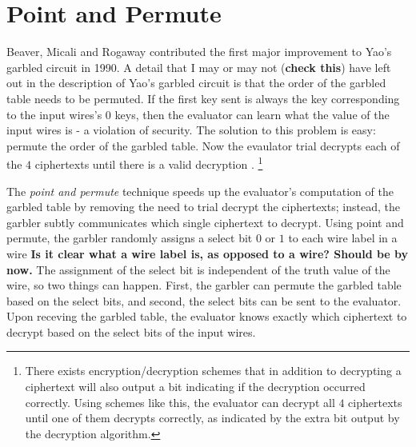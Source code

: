 
\section{Point and Permute}
Beaver, Micali and Rogaway contributed the first major improvement to Yao's garbled circuit in 1990.
A detail that I may or may not (\textbf{check this}) have left out in the description of Yao's garbled circuit is that the order of the garbled table needs to be permuted.
If the first key sent is always the key corresponding to the input wires's $0$ keys, then the evaluator can learn what the value of the input wires is - a violation of security.
The solution to this problem is easy: permute the order of the garbled table.
Now the evaulator trial decrypts each of the $4$ ciphertexts until there is a valid decryption .
\footnote{There exists encryption/decryption schemes that in addition to decrypting a ciphertext will also output a bit indicating if the decryption occurred correctly. Using schemes like this, the evaluator can decrypt all $4$ ciphertexts until one of them decrypts correctly, as indicated by the extra bit output by the decryption algorithm.}

The \textit{point and permute} technique speeds up the evaluator's computation of the garbled table by removing the need to trial decrypt the ciphertexts; instead, the garbler subtly communicates which single ciphertext to decrypt.
Using point and permute, the garbler randomly assigns a select bit $0$ or $1$ to each wire label in a wire \textbf{Is it clear what a wire label is, as opposed to a wire? Should be by now.}
The assignment of the select bit is independent of the truth value of the wire, so two things can happen. 
First, the garbler can permute the garbled table based on the select bits, and second, the select bits can be sent to the evaluator.
Upon receving the garbled table, the evaluator knows exactly which ciphertext to decrypt based on the select bits of the input wires.

